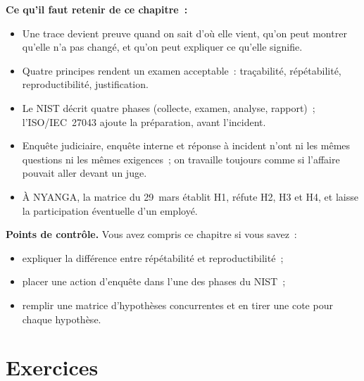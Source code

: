 \begin{boxresume}
\textbf{Ce qu'il faut retenir de ce chapitre~:}
\begin{itemize}
    \item Une trace devient preuve quand on sait d'où elle vient, qu'on peut
          montrer qu'elle n'a pas changé, et qu'on peut expliquer ce qu'elle
          signifie.
    \item Quatre principes rendent un examen acceptable~: traçabilité,
          répétabilité, reproductibilité, justification.
    \item Le NIST décrit quatre phases (collecte, examen, analyse, rapport)~;
          l'ISO/IEC~27043 ajoute la préparation, avant l'incident.
    \item Enquête judiciaire, enquête interne et réponse à incident n'ont ni
          les mêmes questions ni les mêmes exigences~; on travaille toujours
          comme si l'affaire pouvait aller devant un juge.
    \item À NYANGA, la matrice du 29~mars établit H1, réfute H2, H3 et H4,
          et laisse \NEK{} la participation éventuelle d'un employé.
\end{itemize}
\end{boxresume}

\begin{boxinfo}
\textbf{Points de contrôle.} Vous avez compris ce chapitre si vous savez~:
\begin{itemize}
    \item expliquer la différence entre répétabilité et reproductibilité~;
    \item placer une action d'enquête dans l'une des phases du NIST~;
    \item remplir une matrice d'hypothèses concurrentes et en tirer une
          cote pour chaque hypothèse.
\end{itemize}
\end{boxinfo}

\section*{Exercices}

